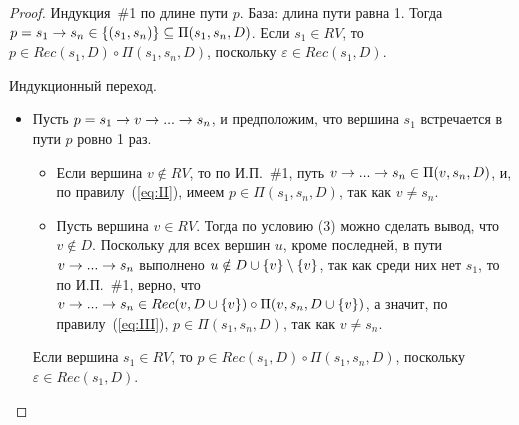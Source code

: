 \begin{proof}
Индукция~\#1 по длине пути $p$. 
База: длина пути равна 1. Тогда $p = s_1 \rightarrow s_n \in \{(s_1,s_n)\} \subseteq \Pi(s_1,s_n,D)$.
Если $s_1 \in RV$, то $p \in Rec(s_1,D) \circ \Pi(s_1,s_n,D)$, поскольку $\varepsilon \in Rec(s_1,D)$.

Индукционный переход.
\begin{itemize}
    \item Пусть $p = s_1 \rightarrow v \rightarrow ... \rightarrow s_n$, и предположим, что вершина $s_1$ встречается в пути $p$ ровно 1 раз.
    \begin{itemize}
        \item Если вершина $v \notin RV$, то по И.П.~\#1, путь $v \rightarrow ... \rightarrow s_n \in \Pi(v,s_n,D)$, и, по правилу~(\ref{eq:II}), имеем $p \in \Pi(s_1,s_n,D)$, 
        так как $v \neq s_n$.
        \item Пусть вершина $v \in RV$. Тогда по условию (3) можно сделать вывод, что $v \notin D$.
        Поскольку для всех вершин $u$, кроме последней, в пути $v \rightarrow ... \rightarrow s_n$ выполнено 
        $u \notin D \cup \{v\} \setminus \{v\}$, так как среди них нет $s_1$,
        то по И.П.~\#1, верно, что $v \rightarrow ... \rightarrow s_n \in Rec(v,D \cup \{v\}) \circ \Pi(v, s_n,D \cup \{v\})$, а значит, по правилу~(\ref{eq:III}), 
        $p \in \Pi(s_1, s_n, D)$, так как $v \neq s_n$.
    \end{itemize}
    Если вершина $s_1 \in RV$, то $p \in Rec(s_1,D) \circ \Pi(s_1,s_n,D)$, поскольку $\varepsilon \in Rec(s_1,D)$.
    

\end{itemize}
\end{proof}
